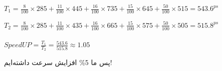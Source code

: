 \setLTR

$T_1 = \frac{8}{100} \times 285 + \frac{11}{100} \times 445 +\frac{16}{100} \times 735 + \frac{15}{100} \times 645 +\frac{50}{100} \times 515  = 543.6^{ps}$

$T_2 = \frac{8}{100} \times 285 + \frac{11}{100} \times 435 +\frac{16}{100} \times 665 + \frac{15}{100} \times 575 +\frac{50}{100} \times 505  = 515.8^{ps}$ \\ \\



$SpeedUP = \frac{T_1}{T_2} = \frac{543.6}{515.8} \approx 1.05$
\setRTL

پس ما 5\% افزایش سرعت داشته‌ایم!